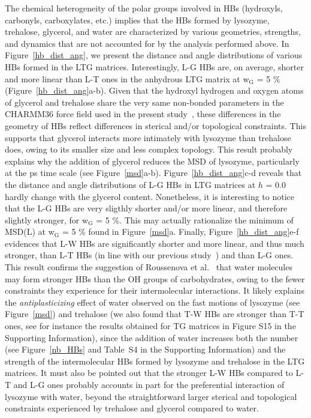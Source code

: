 \documentclass[journal=jpcbfk,manuscript=article]{achemso}
\begin{document}
\begin{singlespacing}
The chemical heterogeneity of the polar groups involved in HBs (hydroxyls, carbonyls, carboxylates, etc.) implies that the HBs
formed by lysozyme, trehalose, glycerol, and water are characterized by various geometries, strengths, and dynamics that
are not accounted for by the analysis performed above. In Figure~\ref{hb_dist_ang}, we present the distance and angle 
distributions of various HBs formed in the LTG matrices. 
Interestingly, L-G HBs are, on average, shorter and more linear than L-T ones in the 
anhydrous LTG matrix at w$_{\textrm{G}}$ = 5 \% (Figure~\ref{hb_dist_ang}a-b). Given that the hydroxyl hydrogen and oxygen 
atoms of glycerol and trehalose share the very same non-bonded parameters in the 
CHARMM36 force field used in the present study~\cite{Guvench2008,Guvench2009,Hatcher2009}, 
these differences in the geometry of HBs reflect differences in sterical and/or 
topological constraints. This supports that glycerol interacts more intimately with lysozyme than trehalose does, 
owing to its smaller size and less complex topology. This result probably explains why the addition of glycerol reduces the MSD of 
lysozyme, particularly at the ps time scale (see Figure~\ref{msd}a-b). Figure~\ref{hb_dist_ang}c-d reveals that the distance and angle
distributions of L-G HBs in LTG matrices at $h$ = 0.0 hardly change with the glycerol content. Nonetheless, it is
interesting to notice that the L-G HBs are very sligthly shorter and/or more linear, and therefore slightly stronger, 
for w$_{\textrm{G}}$ = 5 \%. This may actually rationalize the minimum of MSD(L) at w$_{\textrm{G}}$ = 5 \% found in
Figure~\ref{msd}a. Finally, Figure~\ref{hb_dist_ang}e-f evidences that L-W HBs are significantly shorter and more linear, and thus much stronger, than 
L-T HBs (in line with our previous study~\cite{Lerbret2012}) and than L-G ones. This result confirms the suggestion of Roussenova et 
al.~\cite{Roussenova2014} that water molecules may form stronger HBs than the OH groups of carbohydrates, owing to the fewer 
constraints they experience for their intermolecular interactions. 
It likely explains the \textit{antiplasticizing}
effect of water observed on the fast motions of lysozyme (see Figure~\ref{msd}) and trehalose (we also found that T-W HBs
are stronger than T-T ones, see for instance the results obtained for TG matrices in Figure S15 in the Supporting Information), 
since the addition of water increases both the number 
(see Figure~\ref{nb_HBs} and Table~S4 in the Supporting Information) and the strength of the intermolecular 
HBs formed by lysozyme and trehalose in the LTG matrices.
It must also be pointed out that the stronger L-W HBs compared to L-T and L-G ones 
probably accounts in part for the preferential interaction of lysozyme with water, beyond the straightforward larger 
sterical and topological constraints experienced by trehalose and glycerol compared to water.



\end{singlespacing}
\end{document}
